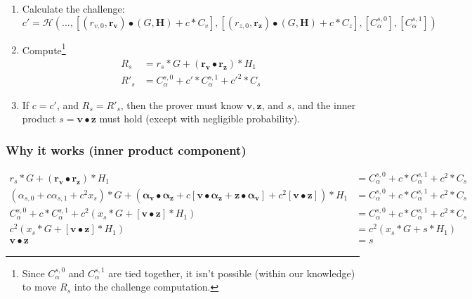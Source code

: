 \begin{enumerate}
	\item Calculate the challenge:
	\[c' = \mathcal{H}(...,[(r_{v,0},\boldsymbol{r_v}) \bullet (G,\textbf{H}) + c*C_v],[(r_{z,0},\boldsymbol{r_z}) \bullet (G,\textbf{H}) + c*C_z],[C^{s,0}_{\alpha}],[C^{s,1}_{\alpha}])\]
	\item Compute\footnote{Since $C^{s,0}_{\alpha}$ and $C^{s,1}_{\alpha}$ are tied together, it isn't possible (within our knowledge) to move $R_s$ into the challenge computation.}
	\begin{align*}
	R_s &= r_s*G + (\boldsymbol{r_v} \bullet \boldsymbol{r_z})*H_1 \\
	R'_s &= C_{\alpha}^{s,0} + c'*C_{\alpha}^{s,1} + c'^2*C_s
	\end{align*}
	\item If $c = c'$, and $R_s = R'_s$, then the prover must know $\boldsymbol{v}, \boldsymbol{z}$, and $s$, and the inner product $s = \boldsymbol{v} \bullet \boldsymbol{z}$ must hold (except with negligible probability).
\end{enumerate}

\subsubsection*{Why it works (inner product component)}

\begin{align*}
r_s*G + (\boldsymbol{r_v} \bullet \boldsymbol{r_z})*H_1 &= C_{\alpha}^{s,0} + c*C_{\alpha}^{s,1} + c^2*C_s \\
(\alpha_{s,0} + c \alpha_{s,1} + c^2 x_s)*G + (\boldsymbol{\alpha_v} \bullet \boldsymbol{\alpha_z} + c[\boldsymbol{v} \bullet \boldsymbol{\alpha_z} + \boldsymbol{z} \bullet \boldsymbol{\alpha_v}] + c^2 [\boldsymbol{v} \bullet \boldsymbol{z}])*H_1 &= C_{\alpha}^{s,0} + c*C_{\alpha}^{s,1} + c^2*C_s \\
C_{\alpha}^{s,0} + c*C_{\alpha}^{s,1} + c^2 (x_s*G + [\boldsymbol{v} \bullet \boldsymbol{z}]*H_1) &= C_{\alpha}^{s,0} + c*C_{\alpha}^{s,1} + c^2*C_s \\
c^2 (x_s*G + [\boldsymbol{v} \bullet \boldsymbol{z}]*H_1) &= c^2(x_s*G + s*H_1) \\
\boldsymbol{v} \bullet \boldsymbol{z} &= s
\end{align*}

